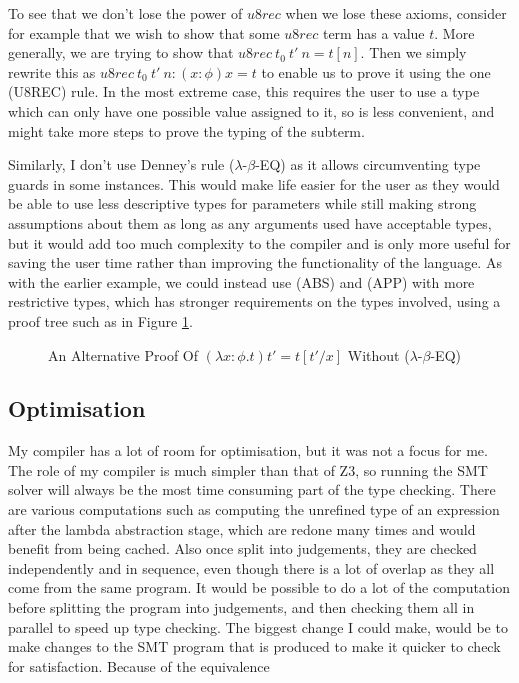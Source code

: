 To see that we don't lose the power of $u8rec$ when we lose these axioms, consider for example that
we wish to show that some $u8rec$ term has a value $t$.
More generally, we are trying to show that $u8rec\ t_0\ t'\ n = t[n]$.
Then we simply rewrite this as $u8rec\ t_0\ t'\ n: (x: \phi)x = t$ to enable us to prove it using
the one (U8REC) rule.
In the most extreme case, this requires the user to use a type which can only have one possible value
assigned to it, so is less convenient, and might take more steps to prove the typing of the subterm.

Similarly, I don't use Denney's rule ($\lambda$-$\beta$-EQ) as it allows circumventing type guards
in some instances.
This would make life easier for the user as they would be able to use less descriptive types for
parameters while still making strong assumptions about them as long as any arguments used have
acceptable types, but it would add too much complexity to the compiler and is only more useful
for saving the user time rather than improving the functionality of the language.
As with the earlier example, we could instead use (ABS) and (APP) with more restrictive types,
which has stronger requirements on the types involved, using a proof tree such as in Figure
\ref{fig:beta_eq}.

\begin{figure}
    \centering
    \begin{prooftree}
    \end{prooftree}
    \caption{An Alternative Proof Of $(\lambda x: \phi . t) t' = t[t'/x]$ Without ($\lambda$-$\beta$-EQ)}
    \label{fig:beta_eq}
\end{figure}

\subsection{Optimisation}

My compiler has a lot of room for optimisation, but it was not a focus for me.
The role of my compiler is much simpler than that of Z3,
so running the SMT solver will always be the most time consuming part of the type checking.
There are various computations such as computing the unrefined type of an expression after the lambda
abstraction stage, which are redone many times and would benefit from being cached.
Also once split into judgements, they are checked independently and in sequence, even though there
is a lot of overlap as they all come from the same program.
It would be possible to do a lot of the computation before splitting the program into judgements,
and then checking them all in parallel to speed up type checking.
The biggest change I could make, would be to make changes to the SMT program that is produced to
make it quicker to check for satisfaction.
Because of the equivalence

